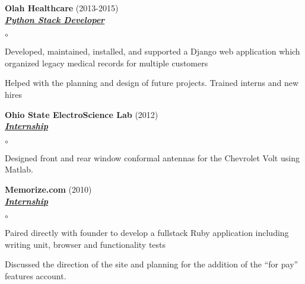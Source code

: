 \documentclass{article}
\newcommand{\employer}[3]{{ \textbf{#1} (#2)\\ \underline{\textbf{\emph{#3}}}\\  }}
\newenvironment{achievements}{\begin{list}{$\circ$}{\topsep 0pt \itemsep -2pt}}{\vspace*{4pt}\end{list}}
\begin{document}
\employer{Olah Healthcare}{2013-2015}{Python Stack Developer}
	\begin{achievements}
	\item Developed, maintained, installed, and supported a Django web application which organized legacy medical records for multiple
	      customers
	\item Helped with the planning and design of future projects. Trained interns and new hires
	\end{achievements}

\newpage

\employer{Ohio State ElectroScience Lab}{2012}{Internship}
	\begin{achievements}
	\item Designed front and rear window conformal antennas for the Chevrolet Volt using Matlab.
	\end{achievements}

\employer{Memorize.com}{2010}{Internship}
	\begin{achievements}
	\item Paired directly with founder to develop a fullstack Ruby application including writing
	      unit, browser and functionality tests
	\item Discussed the direction of the site and planning
          for the addition of the ``for pay'' features
	account.
	\end{achievements}
\end{document}
